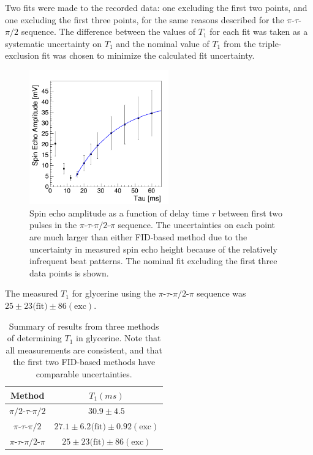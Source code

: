 Two fits were made to the recorded data: one excluding the first two points, and one excluding the first three points, for the same reasons described for the $\pi$-$\tau$-$\pi/2$ sequence. The difference between the values of $T_{1}$ for each fit was taken as a systematic uncertainty on $T_{1}$ and the nominal value of $T_{1}$ from the triple-exclusion fit was chosen to minimize the calculated fit uncertainty. 

\begin{figure}[htb]
\includegraphics[width=6cm]{threePulse.png}
\caption{Spin echo amplitude as a function of delay time $\tau$ between first two pulses in the $\pi$-$\tau$-$\pi/2$-$\pi$ sequence. The uncertainties on each point are much larger than either FID-based method due to the uncertainty in measured spin echo height because of the relatively infrequent beat patterns. The nominal fit excluding the first three data points is shown.}
\label{fig:three}
\end{figure}

The measured $T_1$ for glycerine using the $\pi$-$\tau$-$\pi/2$-$\pi$ sequence was $25 \pm 23\mathrm{(fit}) \pm 86 \mathrm{(exc)}$.

\begin{table}[h]
\caption{\label{t:glyc} Summary of results from three methods of determining $T_1$ in glycerine. Note that all measurements are consistent, and that the first two FID-based methods have comparable uncertainties. }
\begin{tabular}{|c|c|}
\hline
Method & $T_{1} (ms)$ \\
\hline
$\pi/2$-$\tau$-$\pi/2$ & $30.9\pm4.5$ \\
\hline
$\pi$-$\tau$-$\pi/2$ & $27.1 \pm 6.2\mathrm{(fit}) \pm 0.92 \mathrm{(exc)}$ \\
\hline
$\pi$-$\tau$-$\pi/2$-$\pi$ & $25 \pm 23\mathrm{(fit}) \pm 86 \mathrm{(exc)}$ \\
\hline
\end{tabular}
\end{table}

